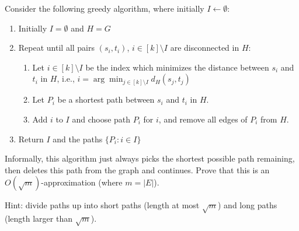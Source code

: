 \documentclass[11pt]{article}
\begin{document}
Consider the following greedy algorithm, where initially $I \leftarrow \emptyset$:
\begin{enumerate}[label=\arabic*.]
\item Initially $I = \emptyset$ and $H = G$
\item Repeat until all pairs $(s_i, t_i)$, $i \in [k] \setminus I$ are disconnected in $H$:
	\begin{enumerate}
	\item Let $i \in [k] \setminus I$ be the index which minimizes the distance between $s_i$ and $t_i$ in $H$, i.e., $i = \arg\min_{j \in [k] \setminus I} d_H(s_j, t_j)$
	\item Let $P_{i}$ be a shortest path between $s_i$ and $t_i$ in $H$.
	\item Add $i$ to $I$ and choose path $P_{i}$ for $i$, and remove all edges of $P_{i}$ from $H$.
	\end{enumerate}
\item Return $I$ and the paths $\{P_i : i \in I\}$
\end{enumerate}

Informally, this algorithm just always picks the shortest possible path remaining, then deletes this path from the graph and continues.  Prove that this is an $O(\sqrt{m})$-approximation (where $m = |E|$).  

Hint: divide paths up into short paths (length at most $\sqrt{m}$) and long paths (length larger than $\sqrt{m}$).
\end{document}
